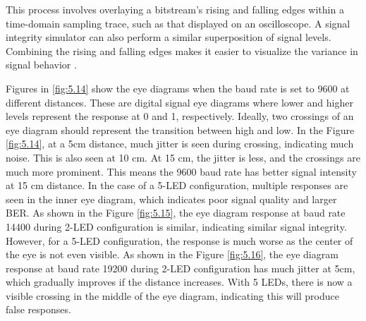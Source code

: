 This process involves overlaying a bitstream's rising and falling edges within a time-domain sampling trace, such as that displayed on an oscilloscope. A signal integrity simulator can also perform a similar superposition of signal levels. Combining the rising and falling edges makes it easier to visualize the variance in signal behavior \cite{eye_2022} \cite{eye_2023}.

Figures in \ref{fig:5.14} show the eye diagrams when the baud rate is set to 9600 at different distances. These are digital signal eye diagrams where lower and higher levels represent the response at 0 and 1, respectively. Ideally, two crossings of an eye diagram should represent the transition between high and low. In the Figure \ref{fig:5.14}, at a 5cm distance, much jitter is seen during crossing, indicating much noise. This is also seen at 10 cm. At 15 cm, the jitter is less, and the crossings are much more prominent. This means the 9600 baud rate has better signal intensity at 15 cm distance. In the case of a 5-LED configuration, multiple responses are seen in the inner eye diagram, which indicates poor signal quality and larger BER. As shown in the Figure \ref{fig:5.15}, the eye diagram response at baud rate 14400 during 2-LED configuration is similar, indicating similar signal integrity. However, for a 5-LED configuration, the response is much worse as the center of the eye is not even visible. As shown in the Figure \ref{fig:5.16}, the eye diagram response at baud rate 19200 during 2-LED configuration has much jitter at 5cm, which gradually improves if the distance increases. With 5 LEDs, there is now a visible crossing in the middle of the eye diagram, indicating this will produce false responses. 

